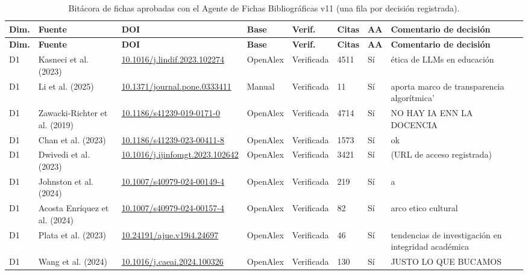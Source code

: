 {\footnotesize\setlength{\tabcolsep}{4pt}
\begin{longtable}{|p{0.55cm}|p{2.6cm}|p{2.8cm}|p{1.3cm}|p{1.6cm}|p{0.8cm}|p{0.45cm}|p{2.4cm}|}
\caption{Bitácora de fichas aprobadas con el Agente de Fichas Bibliográficas v11 (una fila por decisión registrada).}\label{tab:bitacora-corpus}\\
\hline
\rowcolor{bgCotejo}
\textbf{Dim.} & \textbf{Fuente} & \textbf{DOI} & \textbf{Base} & \textbf{Verif.} & \textbf{Citas} & \textbf{AA} & \textbf{Comentario de decisión} \\
\hline
\endfirsthead
\hline
\rowcolor{bgCotejo}
\textbf{Dim.} & \textbf{Fuente} & \textbf{DOI} & \textbf{Base} & \textbf{Verif.} & \textbf{Citas} & \textbf{AA} & \textbf{Comentario de decisión} \\
\hline
\endhead
D1 & Kasneci et al. (2023) & {\scriptsize \url{10.1016/j.lindif.2023.102274}} & OpenAlex & Verificada & 4511 & Sí & ética de LLMs en educación \\
\hline
D1 & Li et al. (2025) & {\scriptsize \url{10.1371/journal.pone.0333411}} & Manual & Verificada & 11 & Sí & aporta marco de transparencia algorítmica' \\
\hline
D1 & Zawacki-Richter et al. (2019) & {\scriptsize \url{10.1186/s41239-019-0171-0}} & OpenAlex & Verificada & 4714 & Sí & NO HAY IA ENN LA DOCENCIA \\
\hline
D1 & Chan et al. (2023) & {\scriptsize \url{10.1186/s41239-023-00411-8}} & OpenAlex & Verificada & 1573 & Sí & ok \\
\hline
D1 & Dwivedi et al. (2023) & {\scriptsize \url{10.1016/j.ijinfomgt.2023.102642}} & OpenAlex & Verificada & 3421 & Sí & (URL de acceso registrada) \\
\hline
D1 & Johnston et al. (2024) & {\scriptsize \url{10.1007/s40979-024-00149-4}} & OpenAlex & Verificada & 219 & Sí & a \\
\hline
D1 & Acosta Enríquez et al. (2024) & {\scriptsize \url{10.1007/s40979-024-00157-4}} & OpenAlex & Verificada & 82 & Sí & arco etico cultural \\
\hline
D1 & Plata et al. (2023) & {\scriptsize \url{10.24191/ajue.v19i4.24697}} & OpenAlex & Verificada & 46 & Sí & tendencias de investigación en integridad académica \\
\hline
D1 & Wang et al. (2024) & {\scriptsize \url{10.1016/j.caeai.2024.100326}} & OpenAlex & Verificada & 130 & Sí & JUSTO LO QUE BUCAMOS \\

\end{longtable}}
